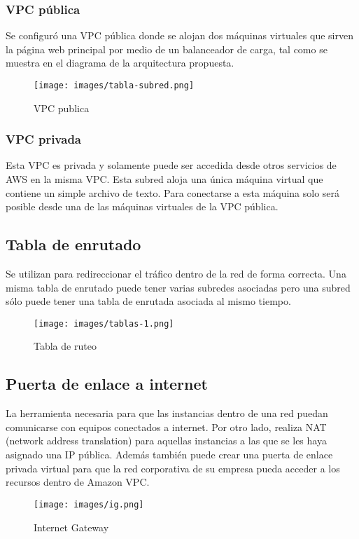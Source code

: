 \documentclass{article}
\begin{document}
\subsubsection{VPC pública}
Se configuró una VPC pública donde se alojan dos máquinas virtuales que sirven la página web principal por medio de un balanceador
de carga, tal como se muestra en el diagrama de la arquitectura propuesta.
\begin{figure}[h]
        \texttt{[image: images/tabla-subred.png]}
                 \caption{VPC publica}
\end{figure}

\subsubsection{VPC privada}
Esta VPC es privada y solamente puede ser accedida desde otros servicios de AWS en la misma VPC. Esta subred aloja una única máquina
virtual que contiene un simple archivo de texto. Para conectarse a esta máquina solo será posible desde una de las máquinas virtuales
de la VPC pública.

\subsection{Tabla de enrutado}
Se utilizan para redireccionar el tráfico dentro de la red de forma correcta. Una misma tabla de enrutado puede tener varias subredes
asociadas pero una subred sólo puede tener una tabla de enrutada asociada al mismo tiempo.
\begin{figure}[h]
        \texttt{[image: images/tablas-1.png]}
                 \caption{Tabla de ruteo}
\end{figure}


\subsection{Puerta de enlace a internet}
La herramienta necesaria para que las instancias dentro de una red puedan comunicarse con equipos conectados a internet. Por otro lado,
realiza NAT (network address translation) para aquellas instancias a las que se les haya asignado una IP pública. Además también
puede crear una puerta de enlace privada virtual para que la red corporativa de su empresa pueda acceder a los recursos dentro de 
Amazon VPC.
\begin{figure}[h]
        \texttt{[image: images/ig.png]}
                 \caption{Internet Gateway}
\end{figure}
\end{document}
